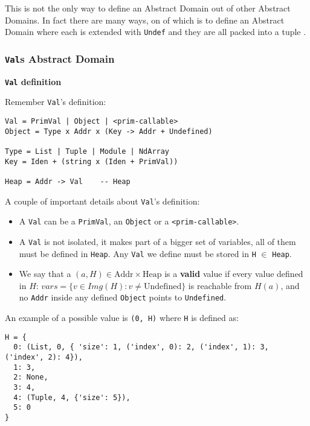 This is not the only way to define an Abstract Domain out of other
Abstract Domains. In fact there are many ways, on of which is to define
an Abstract Domain where each is extended with \texttt{Undef} and they
are all packed into a tuple {}.

{}

\subsubsection{\texorpdfstring{\texttt{Val}s Abstract
Domain}{Vals Abstract Domain}}\label{vals-abstract-domain}

\noindent \textbf{\texttt{Val} definition}

Remember \texttt{Val}'s definition:

\begin{verbatim}
Val = PrimVal | Object | <prim-callable>
Object = Type x Addr x (Key -> Addr + Undefined)

Type = List | Tuple | Module | NdArray
Key = Iden + (string x (Iden + PrimVal))

Heap = Addr -> Val    -- Heap
\end{verbatim}

A couple of important details about \texttt{Val}'s definition:

\begin{itemize}
\tightlist
\item
  A \texttt{Val} can be a \texttt{PrimVal}, an \texttt{Object} or a
  \texttt{\textless{}prim-callable\textgreater{}}.
\item
  A \texttt{Val} is not isolated, it makes part of a bigger set of
  variables, all of them must be defined in \texttt{Heap}. Any
  \texttt{Val} we define must be stored in \texttt{H} \(\in\)
  \texttt{Heap}.
\item
  We say that a \((a, H) \in \text{Addr} \times \text{Heap}\) is a
  \textbf{valid} value if every value defined in \(H\):
  \(vars = \{v \in Img(H) : v \ne \text{Undefined}\}\) is reachable from
  \(H(a)\), and no \texttt{Addr} inside any defined \texttt{Object}
  points to \texttt{Undefined}.
\end{itemize}

An example of a possible value is \texttt{(0,\ H)} where \texttt{H} is
defined as:

\begin{verbatim}
H = {
  0: (List, 0, { 'size': 1, ('index', 0): 2, ('index', 1): 3, ('index', 2): 4}),
  1: 3,
  2: None,
  3: 4,
  4: (Tuple, 4, {'size': 5}),
  5: 0
}
\end{verbatim}

